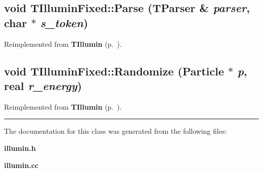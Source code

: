 \subsection{\setlength{\rightskip}{0pt plus 5cm}void TIllumin\-Fixed::Parse ({\bf TParser} \& {\em parser}, char $\ast$ {\em s\_\-token})\hspace{0.3cm}{\tt  [virtual]}}



Reimplemented from {\bf TIllumin} {\rm (p.~\pageref{TIllumin_a0})}.\label{TIlluminFixed_a2}
\subsection{\setlength{\rightskip}{0pt plus 5cm}void TIllumin\-Fixed::Randomize ({\bf Particle} $\ast$ {\em p}, {\bf real} {\em r\_\-energy})\hspace{0.3cm}{\tt  [virtual]}}



Reimplemented from {\bf TIllumin} {\rm (p.~\pageref{TIllumin_a1})}.\vspace{0.4cm}\hrule\vspace{0.2cm}
The documentation for this class was generated from the following files:\begin{CompactItemize}
\item 
{\bf illumin.h}\item 
{\bf illumin.cc}\end{CompactItemize}
